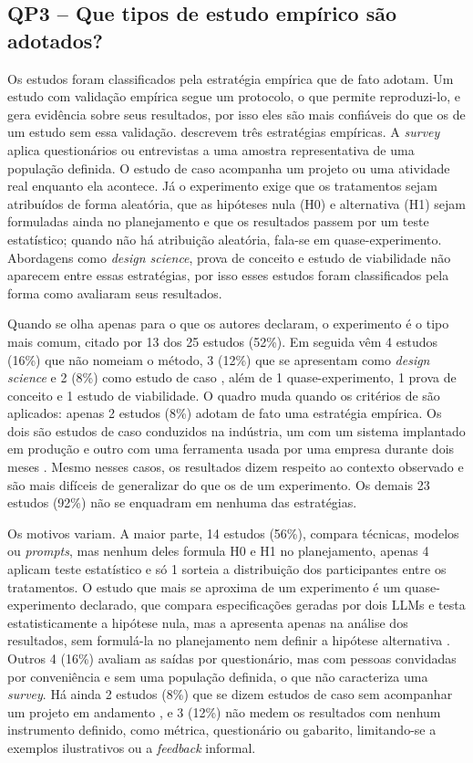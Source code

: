 \subsection{QP3 -- Que tipos de estudo empírico são adotados?}
\label{sec:qp3}

Os estudos foram classificados pela estratégia empírica que de fato adotam. Um estudo com validação empírica segue um protocolo, o que permite reproduzi-lo, e gera evidência sobre seus resultados, por isso eles são mais confiáveis do que os de um estudo sem essa validação.  descrevem três estratégias empíricas. A \textit{survey} aplica questionários ou entrevistas a uma amostra representativa de uma população definida. O estudo de caso acompanha um projeto ou uma atividade real enquanto ela acontece. Já o experimento exige que os tratamentos sejam atribuídos de forma aleatória, que as hipóteses nula (H0) e alternativa (H1) sejam formuladas ainda no planejamento e que os resultados passem por um teste estatístico; quando não há atribuição aleatória, fala-se em quase-experimento. Abordagens como \textit{design science}, prova de conceito e estudo de viabilidade não aparecem entre essas estratégias, por isso esses estudos foram classificados pela forma como avaliaram seus resultados.

Quando se olha apenas para o que os autores declaram, o experimento é o tipo mais comum, citado por 13 dos 25 estudos (52\%). Em seguida vêm 4 estudos (16\%) que não nomeiam o método, 3 (12\%) que se apresentam como \textit{design science} e 2 (8\%) como estudo de caso \cite{wang2025,ferreira2025}, além de 1 quase-experimento, 1 prova de conceito e 1 estudo de viabilidade. O quadro muda quando os critérios de  são aplicados: apenas 2 estudos (8\%) adotam de fato uma estratégia empírica. Os dois são estudos de caso conduzidos na indústria, um com um sistema implantado em produção \cite{baker2026} e outro com uma ferramenta usada por uma empresa durante dois meses \cite{ferreira2025}. Mesmo nesses casos, os resultados dizem respeito ao contexto observado e são mais difíceis de generalizar do que os de um experimento. Os demais 23 estudos (92\%) não se enquadram em nenhuma das estratégias.

Os motivos variam. A maior parte, 14 estudos (56\%), compara técnicas, modelos ou \textit{prompts}, mas nenhum deles formula H0 e H1 no planejamento, apenas 4 aplicam teste estatístico e só 1 sorteia a distribuição dos participantes entre os tratamentos. O estudo que mais se aproxima de um experimento é um quase-experimento declarado, que compara especificações geradas por dois LLMs e testa estatisticamente a hipótese nula, mas a apresenta apenas na análise dos resultados, sem formulá-la no planejamento nem definir a hipótese alternativa \cite{hassani2026}. Outros 4 (16\%) avaliam as saídas por questionário, mas com pessoas convidadas por conveniência e sem uma população definida, o que não caracteriza uma \textit{survey}. Há ainda 2 estudos (8\%) que se dizem estudos de caso sem acompanhar um projeto em andamento \cite{wang2025,zyberaj2026}, e 3 (12\%) não medem os resultados com nenhum instrumento definido, como métrica, questionário ou gabarito, limitando-se a exemplos ilustrativos ou a \textit{feedback} informal.


